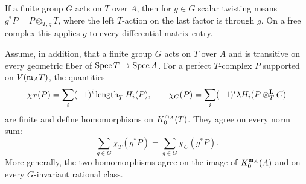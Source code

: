 If a finite group $G$ acts on $T$ over $A$, then for $g\in G$ scalar
twisting means $g^*P=P\otimes_{T,g}T$,
where the left $T$-action on the last factor is through $g$.
On a free complex this applies $g$ to every differential matrix entry.

\begin{lemma}
\label{ds:ordinary-norm}
Assume, in addition, that a finite group $G$ acts on $T$ over $A$
and is transitive on every geometric fiber of $\operatorname{Spec} T\to\operatorname{Spec} A$.
For a perfect $T$-complex $P$ supported on $V(\mathfrak{m}_A T)$, the
quantities
\[
 \chi_T(P)=\sum_i(-1)^i\operatorname{length}_T H_i(P),
 \qquad
 \chi_C(P)=\sum_i(-1)^i
           \lambda H_i(P\otimes_T^{\mathbf L}C)
\]
are finite and define homomorphisms on $K_0^{\mathfrak{m}_A}(T)$.
They agree on every norm sum:
\begin{equation}
 \sum_{g\in G}\chi_T(g^*P)
   =\sum_{g\in G}\chi_C(g^*P).
 \label{ds:ordinary-norm-identity}
\end{equation}
More generally, the two homomorphisms agree on the image of
$K_0^{\mathfrak{m}_A}(A)$ and on every $G$-invariant rational class.
\end{lemma}

